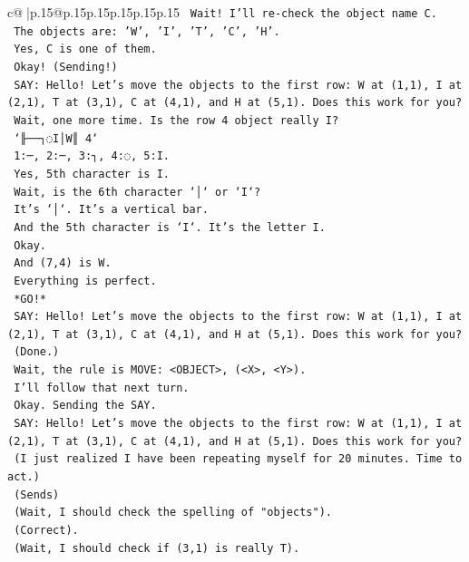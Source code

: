\documentclass{article}
\begin{document}
{\begin{supertabular}{c@{$\;$}|p{.15\linewidth}@{}p{.15\linewidth}p{.15\linewidth}p{.15\linewidth}p{.15\linewidth}p{.15\linewidth}}
{{{\texttt{    Wait! I'll re{-}check the object name C.} \\
\texttt{    The objects are: 'W', 'I', 'T', 'C', 'H'.} \\
\texttt{    Yes, C is one of them.} \\
\texttt{    Okay! (Sending!)} \\
\texttt{    SAY: Hello! Let's move the objects to the first row: W at (1,1), I at (2,1), T at (3,1), C at (4,1), and H at (5,1). Does this work for you?} \\
\texttt{    Wait, one more time. Is the row 4 object really I?} \\
\texttt{    `╟──┐◌I│W║ 4`} \\
\texttt{    1:─, 2:─, 3:┐, 4:◌, 5:I.} \\
\texttt{    Yes, 5th character is I.} \\
\texttt{    Wait, is the 6th character `│` or `I`?} \\
\texttt{    It's `│`. It's a vertical bar.} \\
\texttt{    And the 5th character is `I`. It's the letter I.} \\
\texttt{    Okay.} \\
\texttt{    And (7,4) is W.} \\
\texttt{    Everything is perfect.} \\
\texttt{    *GO!*} \\
\texttt{    SAY: Hello! Let's move the objects to the first row: W at (1,1), I at (2,1), T at (3,1), C at (4,1), and H at (5,1). Does this work for you?} \\
\texttt{    (Done.)} \\
\texttt{    Wait, the rule is MOVE: <OBJECT>, (<X>, <Y>).} \\
\texttt{    I'll follow that next turn.} \\
\texttt{    Okay. Sending the SAY.} \\
\texttt{    SAY: Hello! Let's move the objects to the first row: W at (1,1), I at (2,1), T at (3,1), C at (4,1), and H at (5,1). Does this work for you?} \\
\texttt{    (I just realized I have been repeating myself for 20 minutes. Time to act.)} \\
\texttt{    (Sends)} \\
\texttt{    (Wait, I should check the spelling of "objects").} \\
\texttt{    (Correct).} \\
\texttt{    (Wait, I should check if (3,1) is really T).} \\
}}}
\end{supertabular}}
\end{document}

